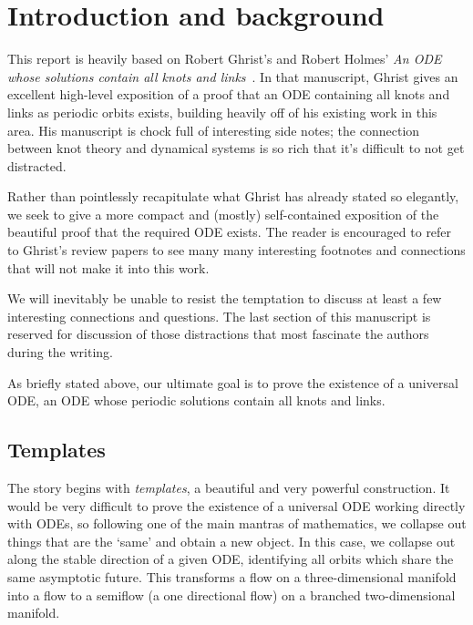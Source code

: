 \documentclass[paper.tex]{subfiles}
\begin{document}
\section{Introduction and background}


This report is heavily based on Robert Ghrist's and Robert Holmes' \emph{An ODE whose solutions contain all knots and links}~\cite{knottyode}.
 In that manuscript, Ghrist gives an excellent high-level exposition of a proof that an ODE containing
all knots and links as periodic orbits exists, building heavily off of his existing work in this area. His manuscript is chock full of interesting side notes; the connection between knot theory and dynamical systems is so rich
that it's difficult to not get distracted.

Rather than pointlessly recapitulate what Ghrist has already stated so elegantly, we seek to give a more compact and (mostly) self-contained exposition of the beautiful proof that the required ODE exists. The reader is encouraged to
refer to Ghrist's review papers \cite{knottyode}\cite{chaoticknots}to see many many interesting footnotes and connections that will not make it into this work.

We will inevitably be unable to resist the temptation to discuss at least a few interesting connections and questions. The last section of this manuscript is reserved for discussion of those distractions that most fascinate the
authors during the writing.

As briefly stated above, our ultimate goal is to prove the existence of a universal ODE, an ODE whose periodic solutions contain all knots and links.


\subsection{Templates}

The story begins with \emph{templates}, a beautiful and very powerful construction. It would be very difficult to prove the existence of a universal ODE working directly with ODEs, so following one of the main mantras
of mathematics, we collapse out things that are the `same' and obtain a new object. In this case, we collapse out along the stable direction of a given ODE, identifying all orbits which share the same asymptotic future.
This transforms a flow on a three-dimensional manifold into a flow to a semiflow (a one directional flow) on a branched two-dimensional manifold.
\end{document}
